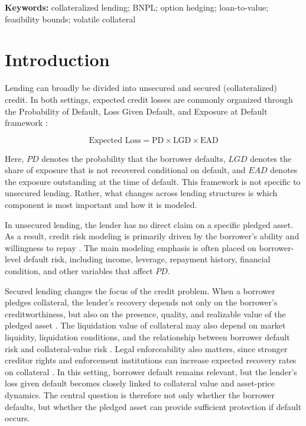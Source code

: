 \documentclass[11pt]{article}
\begin{document}
\noindent \textbf{Keywords:} collateralized lending; BNPL; option hedging; loan-to-value; feasibility bounds; volatile collateral

\section{Introduction}
Lending can broadly be divided into unsecured and secured (collateralized) credit. In both settings, expected credit losses are commonly organized through the Probability of Default, Loss Given Default, and Exposure at Default framework \citep{bcbs_2006_capital}:

$$
\text{Expected Loss} = \text{PD} \times \text{LGD} \times \text{EAD}
$$

Here, $PD$ denotes the probability that the borrower defaults, $LGD$ denotes the share of exposure that is not recovered conditional on default, and $EAD$ denotes the exposure outstanding at the time of default. This framework is not specific to unsecured lending. Rather, what changes across lending structures is which component is most important and how it is modeled.

In unsecured lending, the lender has no direct claim on a specific pledged asset. As a result, credit risk modeling is primarily driven by the borrower’s ability and willingness to repay \citep{cfpb_2022b_secured_unsecured, occ_2001_credit_risk}. The main modeling emphasis is often placed on borrower-level default risk, including income, leverage, repayment history, financial condition, and other variables that affect $PD$.

Secured lending changes the focus of the credit problem. When a borrower pledges collateral, the lender’s recovery depends not only on the borrower’s creditworthiness, but also on the presence, quality, and realizable value of the pledged asset \citep{schuermann_2004_lgd, grunert_weber_2009_recovery}. The liquidation value of collateral may also depend on market liquidity, liquidation conditions, and the relationship between borrower default risk and collateral-value risk \citep{shleifer_vishny_1992_liquidation, barbiero_2023_liquidation}. Legal enforceability also matters, since stronger creditor rights and enforcement institutions can increase expected recovery rates on collateral \citep{degryse_2018_recovery}. In this setting, borrower default remains relevant, but the lender’s loss given default becomes closely linked to collateral value and asset-price dynamics. The central question is therefore not only whether the borrower defaults, but whether the pledged asset can provide sufficient protection if default occurs.
\end{document}

